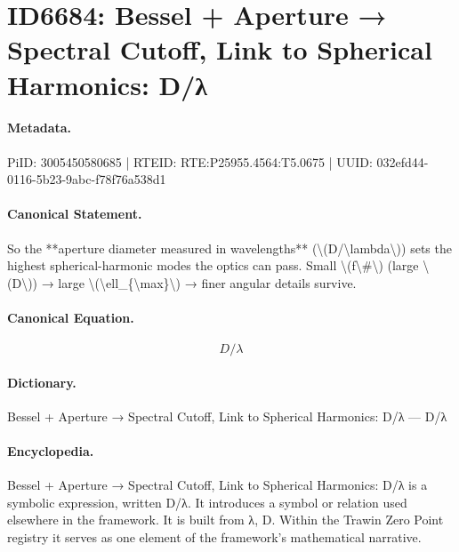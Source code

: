 \section*{ID6684: Bessel + Aperture → Spectral Cutoff, Link to Spherical Harmonics: D/λ}
\paragraph{Metadata.}
PiID: 3005450580685 | RTEID: RTE:P25955.4564:T5.0675 | UUID: 032efd44-0116-5b23-9abc-f78f76a538d1

\paragraph{Canonical Statement.}
So the **aperture diameter measured in wavelengths** (\textbackslash{}(D/\textbackslash{}lambda\textbackslash{})) sets the highest spherical-harmonic modes the optics can pass. Small \textbackslash{}(f\textbackslash{}\#\textbackslash{}) (large \textbackslash{}(D\textbackslash{})) → large \textbackslash{}(\textbackslash{}ell\_\{\textbackslash{}max\}\textbackslash{}) → finer angular details survive.

\paragraph{Canonical Equation.}
\[
D/\lambda
\]

\paragraph{Dictionary.}
Bessel + Aperture → Spectral Cutoff, Link to Spherical Harmonics: D/λ — D/λ

\paragraph{Encyclopedia.}
Bessel + Aperture → Spectral Cutoff, Link to Spherical Harmonics: D/λ is a symbolic expression, written D/λ. It introduces a symbol or relation used elsewhere in the framework. It is built from λ, D. Within the Trawin Zero Point registry it serves as one element of the framework's mathematical narrative.
